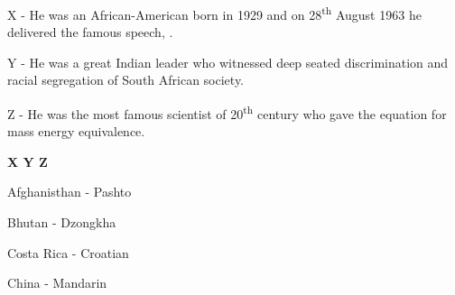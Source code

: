\begin{questions}

\begin{description}
\item X - He was an African-American born in 1929 and on 28\textsuperscript{th} August 1963 he delivered the famous speech, .
\item Y - He was a great Indian leader who witnessed deep seated discrimination and racial segregation of South African society.
\item Z - He was the most famous scientist of 20\textsuperscript{th} century who gave the equation for mass energy equivalence.
\end{description}

{\hspace{1cm} \textbf{X \qquad Y \qquad Z}}

\begin{randomizechoices}
\end{randomizechoices}


\begin{smallroman}
\item Afghanisthan - Pashto
\item Bhutan - Dzongkha
\item Costa Rica - Croatian
\item China - Mandarin
\end{smallroman}

\begin{randomizechoices}
\end{randomizechoices}
\end{questions}
